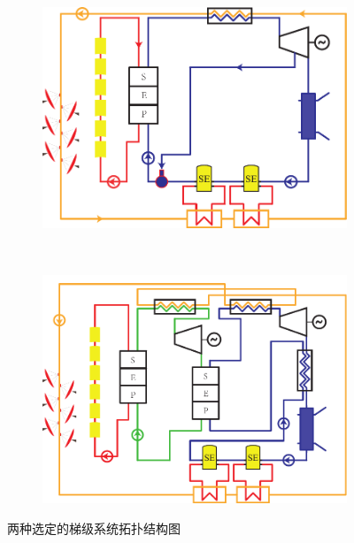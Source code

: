 \begin{figure}[htbp]
\centering
	\begin{subfigure}[b]{0.4\columnwidth}
	\includegraphics[width = \columnwidth]{fig/CascadeSystem1}
	\caption{}\label{fig:CascadeSystem1}
	\end{subfigure}
	~
\begin{subfigure}[b]{0.4\columnwidth}
	\includegraphics[width = \columnwidth]{fig/CascadeSystem2}
	\caption{}\label{fig:CascadeSystem2}
	\end{subfigure}
	\caption{两种选定的梯级系统拓扑结构图}
	\label{fig:CascadeSystems}
\end{figure}

